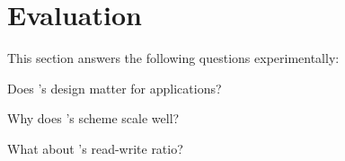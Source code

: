 \section{Evaluation}


This section answers the following questions experimentally:
\begin{CompactItemize}
\item Does \ldu's design matter for applications?

\item Why does \ldu's scheme scale well?

\item What about \ldu's read-write ratio?
\end{CompactItemize}

